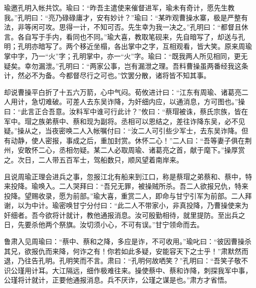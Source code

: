 瑜邀孔明入帐共饮。瑜曰：“昨吾主遣使来催督进军，瑜未有奇计，愿先生教我。”孔明曰：“亮乃碌碌庸才，安有妙计？”瑜曰：“某昨观曹操水寨，极是严整有法，非等闲可攻。思得一计，不知可否。先生幸为我一决之。”孔明曰：“都督且休言。各自写于手内，看同也不同。”瑜大喜，教取笔砚来，先自暗写了，却送与孔明；孔明亦暗写了。两个移近坐榻，各出掌中之字，互相观看，皆大笑。原来周瑜掌中字，乃一“火”字；孔明掌中，亦一“火”字。瑜曰：“既我两人所见相同，更无疑矣。幸勿漏泄。”孔明曰：“两家公事，岂有漏泄之理。吾料曹操虽两番经我这条计，然必不为备。今都督尽行之可也。”饮罢分散，诸将皆不知其事。

却说曹操平白折了十五六万箭，心中气闷。荀攸进计曰：“江东有周瑜、诸葛亮二人用计，急切难破。可差人去东吴诈降，为奸细内应，以通消息，方可图也。”操曰：“此言正合吾意。汝料军中谁可行此计？”攸曰：“蔡瑁被诛，蔡氏宗族，皆在军中。瑁之族弟蔡中、蔡和现为副将。丞相可以恩结之，差往诈降东吴，必不见疑。”操从之，当夜密唤二人入帐嘱付曰：“汝二人可引些少军士，去东吴诈降。但有动静，使人密报，事成之后，重加封赏。休怀二心！”二人曰：“吾等妻子俱在荆州，安敢怀二心，丞相勿疑。某二人必取周瑜、诸葛亮之首，献于麾下。”操厚赏之。次日，二人带五百军士，驾船数只，顺风望着南岸来。

且说周瑜正理会进兵之事，忽报江北有船来到江口，称是蔡瑁之弟蔡和、蔡中，特来投降。瑜唤入。二人哭拜曰：“吾兄无罪，被操贼所杀。吾二人欲报兄仇，特来投降。望赐收录，愿为前部。”瑜大喜，重赏二人，即命与甘宁引军为前部。二人拜谢，以为中计。瑜密唤甘宁分付曰：“此二人不带家小，非真投降，乃曹操使来为奸细者。吾今欲将计就计，教他通报消息。汝可殷勤相待，就里提防。至出兵之日，先要杀他两个祭旗。汝切须小心，不可有误。”甘宁领命而去。

鲁肃入见周瑜曰：“蔡中、蔡和之降，多应是诈，不可收用。”瑜叱曰：“彼因曹操杀其兄，欲报仇而来降，何诈之有！你若如此多疑，安能容天下之士乎！”肃默然而退，乃往告孔明。孔明笑而不言。肃曰：“孔明何故哂笑？”孔明曰：“吾笑子敬不识公瑾用计耳。大江隔远，细作极难往来。操使蔡中、蔡和诈降，刺探我军中事，公瑾将计就计，正要他通报消息。兵不厌诈，公瑾之谋是也。”肃方才省悟。

